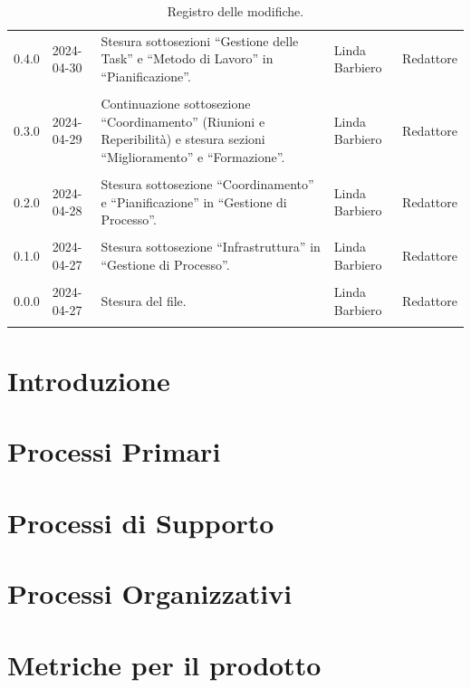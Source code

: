 \documentclass[8pt]{article}
\newcommand{\signatureline}[1]{%
	 \par\vspace{0.5cm}
	\noindent\makebox[\linewidth][r]{\rule{0.2\textwidth}{0.5pt}\hspace{3cm}\makebox[0pt][r]{\vspace{3pt}\footnotesize #1}}%
}
\begin{document}
\begin{table}[ht!]
\begin{tabular}{p{1.2cm} p{2cm} p{6cm} p{3cm} p{2cm}}
		0.4.0 & 2024-04-30 & Stesura sottosezioni ``Gestione delle Task'' e ``Metodo di Lavoro'' in ``Pianificazione''. & Linda Barbiero & Redattore \\\\ %
		0.3.0 & 2024-04-29 & Continuazione sottosezione ``Coordinamento'' (Riunioni e Reperibilità) e stesura sezioni ``Miglioramento'' e ``Formazione''. & Linda Barbiero & Redattore \\\\ %
		0.2.0 & 2024-04-28 & Stesura sottosezione ``Coordinamento'' e ``Pianificazione'' in ``Gestione di Processo''. & Linda Barbiero & Redattore \\\\ %
		0.1.0 & 2024-04-27 & Stesura sottosezione ``Infrastruttura'' in ``Gestione di Processo''. & Linda Barbiero & Redattore \\\\ %
		0.0.0 & 2024-04-27 & Stesura del file. & Linda Barbiero & Redattore \\\\ %
		\bottomrule
	\end{tabular}
	\caption{Registro delle modifiche.}
	\label{table:Registro delle modifiche}
\end{table}
\newpage
{\hypersetup{hidelinks} \tableofcontents}
\clearpage
\newpage
{\hypersetup{hidelinks} \listoffigures}
\newpage
{\hypersetup{hidelinks} \listoftables}
\newpage
\justifying
\section{Introduzione} \label{sec:intro}

\section{Processi Primari} \label{sec:processi_primari}

\section{Processi di Supporto} \label{sec:processi_supporto}

\section{Processi Organizzativi} \label{sec:processi_organizzativi}

\section{Metriche per il prodotto} \label{sec:metriche_prodotto}

\newpage
\end{document}
